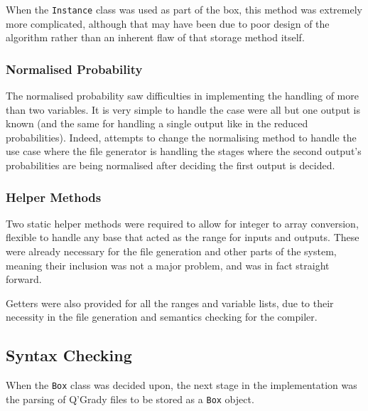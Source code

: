 \documentclass[report.tex]{subfiles}
\begin{document}
When the \texttt{Instance} class was used as part of the box, this method was
extremely more complicated, although that may have been due to poor design of
the algorithm rather than an inherent flaw of that storage method itself.

\subsubsection{Normalised Probability} %
\label{ssub:normalised_probability}
The normalised probability saw difficulties in implementing the handling of more
than two variables. It is very simple to handle the case were all but one output
is known (and the same for handling a single output like in the reduced
probabilities). Indeed, attempts to change the normalising method to handle the
use case where the file generator is handling the stages where the second
output's probabilities are being normalised after deciding the first output is
decided.

 


\subsubsection{Helper Methods} %
\label{ssub:helper_methods}
Two static helper methods were required to allow for integer to array
conversion, flexible to handle any base that acted as the range for inputs and
outputs. These were already necessary for the file generation and other parts
of the system, meaning their inclusion was not a major problem, and was in fact
straight forward.

Getters were also provided for all the ranges and variable lists, due to their
necessity in the file generation and semantics checking for the compiler.

\subsection{Syntax Checking} %
\label{sub:syntax_checking}
When the \texttt{Box} class was decided upon, the next stage in the
implementation was the parsing of Q'Grady files to be stored as a \texttt{Box}
object.
\end{document}
